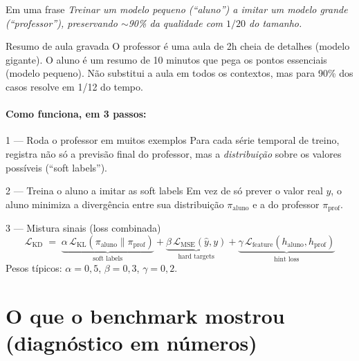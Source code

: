 \documentclass[11pt,a4paper]{article}
\begin{document}
\begin{infobox}{Em uma frase}
\emph{Treinar um modelo pequeno (``aluno'') a imitar um modelo grande
(``professor''), preservando $\sim$90\% da qualidade com $1/20$ do
tamanho.}
\end{infobox}

\begin{analogia}{Resumo de aula gravada}
O professor é uma aula de 2h cheia de detalhes (modelo gigante).
O aluno é um resumo de 10 minutos que pega os pontos essenciais
(modelo pequeno). Não substitui a aula em todos os contextos, mas
para 90\% dos casos resolve em 1/12 do tempo.
\end{analogia}

\paragraph{Como funciona, em 3 passos:}

\begin{passo}{1 --- Roda o professor em muitos exemplos}
Para cada série temporal de treino, registra não só a previsão final
do professor, mas a \emph{distribuição} sobre os valores possíveis
(``soft labels'').
\end{passo}

\begin{passo}{2 --- Treina o aluno a imitar as soft labels}
Em vez de só prever o valor real $y$, o aluno minimiza a divergência
entre sua distribuição $\pi_\text{aluno}$ e a do professor
$\pi_\text{prof}$.
\end{passo}

\begin{passo}{3 --- Mistura sinais (loss combinada)}
\begin{equation}
\mathcal{L}_\text{KD} \;=\;
\underbrace{\alpha\,\mathcal{L}_\text{KL}(\pi_\text{aluno}\|\pi_\text{prof})}_\text{soft labels}
+ \underbrace{\beta\,\mathcal{L}_\text{MSE}(\hat{y},y)}_\text{hard targets}
+ \underbrace{\gamma\,\mathcal{L}_\text{feature}(h_\text{aluno},h_\text{prof})}_\text{hint loss}
\end{equation}
Pesos típicos: $\alpha=0{,}5$, $\beta=0{,}3$, $\gamma=0{,}2$.
\end{passo}

\section{O que o benchmark mostrou (diagnóstico em números)}
\end{document}

